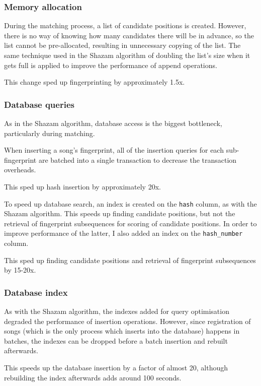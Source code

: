 \documentclass[12pt,a4paper,twoside,openright]{report}
\begin{document}
\subsubsection{Memory allocation}

During the matching process, a list of candidate positions is created. However, there is no way of knowing how many candidates there will be in advance, so the list cannot be pre-allocated, resulting in unnecessary copying of the list. The same technique used in the Shazam algorithm of doubling the list's size when it gets full is applied to improve the performance of append operations.

This change sped up fingerprinting by approximately 1.5x.

\subsubsection{Database queries}

As in the Shazam algorithm, database access is the biggest bottleneck, particularly during matching.

When inserting a song's fingerprint, all of the insertion queries for each sub-fingerprint are batched into a single transaction to decrease the transaction overheads.

This sped up hash insertion by approximately 20x.

To speed up database search, an index is created on the \lstinline{hash} column, as with the Shazam algorithm. This speeds up finding candidate positions, but not the retrieval of fingerprint subsequences for scoring of candidate positions. In order to improve performance of the latter, I also added an index on the \lstinline{hash_number} column.

This sped up finding candidate positions and retrieval of fingerprint subsequences by 15-20x.


\subsubsection{Database index}

As with the Shazam algorithm, the indexes added for query optimisation degraded the performance of insertion operations. However, since registration of songs (which is the only process which inserts into the database) happens in batches, the indexes can be dropped before a batch insertion and rebuilt afterwards.

This speeds up the database insertion by a factor of almost 20, although rebuilding the index afterwards adds around 100 seconds.
\end{document}
